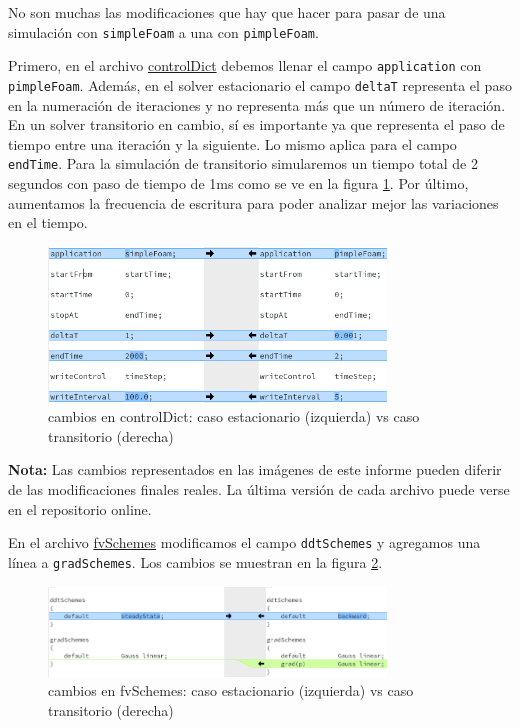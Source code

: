 \documentclass[oneside,a4paper,spanish,links]{amca}
\begin{document}
No son muchas las modificaciones que hay que hacer para pasar de una simulación con \texttt{simpleFoam} a una con \texttt{pimpleFoam}. 

Primero, en el archivo \href{https://github.com/guillerolle/casos_cfd/tree/master/04/case/system/controlDict}{controlDict} debemos llenar el campo \texttt{application} con \texttt{pimpleFoam}. Además, en el solver estacionario el campo \texttt{deltaT} representa el paso en la numeración de iteraciones y no representa más que un número de iteración. En un solver transitorio en cambio, sí es importante ya que representa el paso de tiempo entre una iteración y la siguiente. Lo mismo aplica para el campo \texttt{endTime}. Para la simulación de transitorio simularemos un tiempo total de 2 segundos con paso de tiempo de 1ms como se ve en la figura \ref{fg:controlDict}. Por último, aumentamos la frecuencia de escritura para poder analizar mejor las variaciones en el tiempo.

\begin{figure}[htb]
	\centerline{\includegraphics[width=0.8\textwidth]{Figuras/02_controlDict_1.png}}
	\caption{cambios en controlDict: caso estacionario (izquierda) vs caso transitorio (derecha)} \label{fg:controlDict}
\end{figure}

\textbf{Nota: } Las cambios representados en las imágenes de este informe pueden diferir de las modificaciones finales reales. La última versión de cada archivo puede verse en el repositorio online.

En el archivo \href{https://github.com/guillerolle/casos_cfd/tree/master/04/case/system/fvSchemes}{fvSchemes} modificamos el campo \texttt{ddtSchemes} y agregamos una línea a \texttt{gradSchemes}. Los cambios se muestran en la figura \ref{fg:fvSchemes}.

\begin{figure}[htb]
	\centerline{\includegraphics[width=0.8\textwidth]{Figuras/02_fvSchemes_1.png}} 
	\caption{cambios en fvSchemes: caso estacionario (izquierda) vs caso transitorio (derecha)} \label{fg:fvSchemes}
\end{figure}
\end{document}
